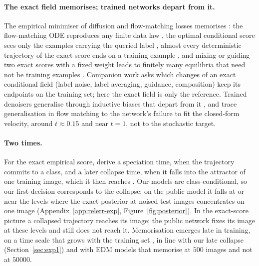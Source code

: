 \documentclass{article} %
\theoremstyle{plain}
\theoremstyle{definition}
\theoremstyle{remark}
\begin{document}
\paragraph{The exact field memorises; trained networks depart from it.} The empirical minimiser
of diffusion and flow-matching losses memorises
\citep{pidstrigach2022manifolds,gu2023memorization,biroli2023diffusion,buchanan2025edge,gao2024flow,bertrand2025closed,li2026memory}:
the flow-matching ODE reproduces any finite data law \citep[Theorem~5.3]{wan2025elucidating}, the
optimal conditional score sees only the examples carrying the queried label
\citep[Theorem~6.4]{baptista2025memorization}, almost every deterministic trajectory of the exact
score ends on a training example \citep[Theorem~3.7, version~3]{liu2025pde}, and mixing or guiding
two exact scores with a fixed weight leads to finitely many equilibria that need not be training
examples \citep[Theorem~2.5, version~2]{liu2026geometric}. Companion work \citep{companionA} asks
which changes of an exact conditional field (label noise, label averaging, guidance, composition)
keep its endpoints on the training set; here the exact field is only the reference. Trained
denoisers generalise through inductive biases that depart from it
\citep{kadkhodaie2024generalization,kamb2024creativity,niedoba2024mechanistic}, and
\citet{bertrand2025closed} trace generalisation in flow matching to the network's failure to fit
the closed-form velocity, around $t\approx0.15$ and near $t=1$, not to the stochastic target.

\paragraph{Two times.} For the exact empirical score, \citet{biroli2024dynamical} derive a
speciation time, when the trajectory commits to a class, and a later collapse time, when it falls
into the attractor of one training image, which it then reaches
\citep[see also][]{raya2023ssb,li2024critical}. Our models are class-conditional, so our first
decision corresponds to the collapse; on the public model it falls at or near the levels where the
exact posterior at noised test images concentrates on one image (Appendix~\ref{app:relerr-exp},
Figure~\ref{fig:posterior}). In the exact-score picture a collapsed trajectory reaches its image;
the public network fixes its image at these levels and still does not reach it. Memorisation
emerges late in training, on a time scale that grows with the training set
\citep{bonnaire2025why,favero2025bigger}, in line with our late collapse (Section~\ref{sec:exp1})
and with EDM models that memorise at $500$ images and not at $50000$.
\end{document}
